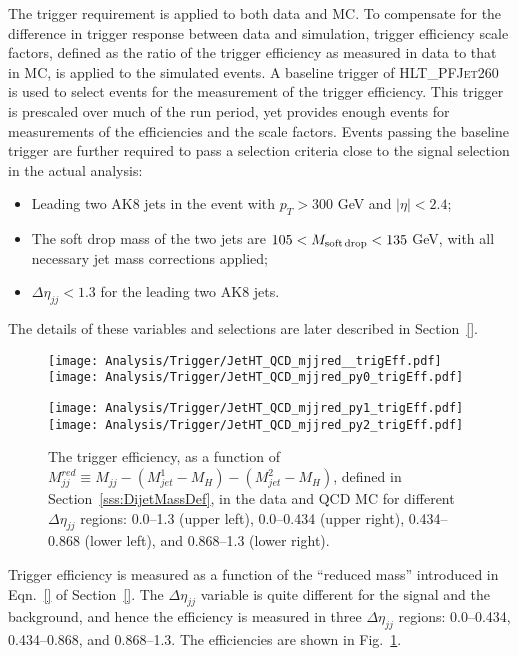 The trigger requirement is applied to both data and MC. To compensate for the difference in trigger response between data and simulation, trigger efficiency scale factors, defined as the ratio of the trigger efficiency as measured in data to that in MC, is applied to the simulated events. A baseline trigger of \textsc{HLT\_PFJet260} is used to select events for the measurement of the trigger efficiency. This trigger is prescaled over much of the run period, yet provides enough events for measurements of the efficiencies and the scale factors. Events passing the baseline trigger are further required to pass a selection criteria close to the signal selection in the actual analysis:
\begin{itemize}
 \item Leading two AK8 jets in the event with $p_{T} > 300$ GeV and $|\eta| < 2.4$;
 \item The soft drop mass of the two jets are $105 < M_{\rm soft\,drop} < 135$ GeV, with all necessary jet mass corrections applied;
 \item $\Delta\eta_{jj} < 1.3$ for the leading two AK8 jets.
\end{itemize}

\noindent
The details of these variables and selections are later described in Section~\ref{}.

\begin{figure}[H]
  \begin{center}
    \texttt{[image: Analysis/Trigger/JetHT\_QCD\_mjjred\_\_trigEff.pdf]}
    \texttt{[image: Analysis/Trigger/JetHT\_QCD\_mjjred\_py0\_trigEff.pdf]}

    \texttt{[image: Analysis/Trigger/JetHT\_QCD\_mjjred\_py1\_trigEff.pdf]}
    \texttt{[image: Analysis/Trigger/JetHT\_QCD\_mjjred\_py2\_trigEff.pdf]}
  \end{center}
  \caption{The trigger efficiency, as a function of $M_{jj}^{red} \equiv M_{jj} - (M_{jet}^{1}-M_{H}) - (M_{jet}^{2}-M_{H})$, defined in Section~\ref{sss:DijetMassDef}, in the data and QCD MC for different $\Delta\eta_{jj}$ regions: 0.0--1.3 (upper left), 0.0--0.434 (upper right), 0.434--0.868 (lower left), and 0.868--1.3 (lower right).}
  \label{fig:trigeEffvsMjj_JetHT_DetaBins}
\end{figure}

Trigger efficiency is measured as a function of the ``reduced mass'' introduced in Eqn.~\ref{} of Section~\ref{}. The $\Delta\eta_{jj}$ variable is quite different for the signal and the background, and hence the efficiency is measured in three $\Delta\eta_{jj}$ regions: 0.0--0.434, 0.434--0.868, and 0.868--1.3. The efficiencies are shown in Fig.~\ref{fig:trigeEffvsMjj_JetHT_DetaBins}.

